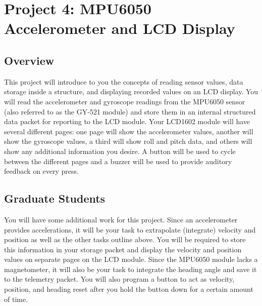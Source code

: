 %

\chapter{Project 4: MPU6050 Accelerometer and LCD Display}

\section*{Overview} 
This project will introduce to you the concepts of reading sensor values, data storage inside a structure, and displaying recorded values on an LCD display. 
You will read the accelerometer and gyroscope readings from the MPU6050 sensor (also referred to as the GY-521 module) and store them in an internal structured data packet for reporting to the LCD module.
Your LCD1602 module will have several different pages: one page will show the accelerometer values, another will show the gyroscope values, a third will show roll and pitch data, and others will show any additional information you desire.
A button will be used to cycle between the different pages and a buzzer will be used to provide auditory feedback on every press.

\section*{Graduate Students} 
You will have some additional work for this project. 
Since an accelerometer provides accelerations, it will be your task to extrapolate (integrate) velocity and position as well as the other tasks outline above.
You will be required to store this information in your storage packet and display the velocity and position values on separate pages on the LCD module.
Since the MPU6050 module lacks a magnetometer, it will also be your task to integrate the heading angle and save it to the telemetry packet.
You will also program a button to act as velocity, position, and heading reset after you hold the button down for a certain amount of time.

